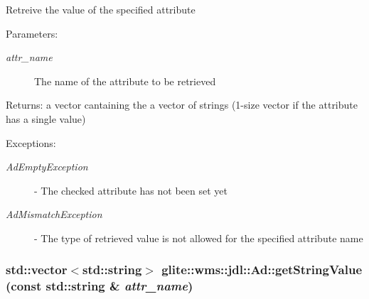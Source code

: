 Retreive the value of the specified attribute \begin{Desc}
\item[Parameters:]
\begin{description}
\item[{\em attr\_\-name}]The name of the attribute to be retrieved \end{description}
\end{Desc}
\begin{Desc}
\item[Returns:]a vector cantaining the a vector of strings (1-size vector if the attribute has a single value) \end{Desc}
\begin{Desc}
\item[Exceptions:]
\begin{description}
\item[{\em Ad\-Empty\-Exception}]- The checked attribute has not been set yet \item[{\em Ad\-Mismatch\-Exception}]- The type of retrieved value is not allowed for the specified attribute name \end{description}
\end{Desc}
\hypertarget{classglite_1_1wms_1_1jdl_1_1Ad_z19_20}{
\subsubsection[getStringValue]{\setlength{\rightskip}{0pt plus 5cm}std::vector$<$std::string$>$ glite::wms::jdl::Ad::get\-String\-Value (const std::string \& {\em attr\_\-name})}}
\label{classglite_1_1wms_1_1jdl_1_1Ad_z19_20}


